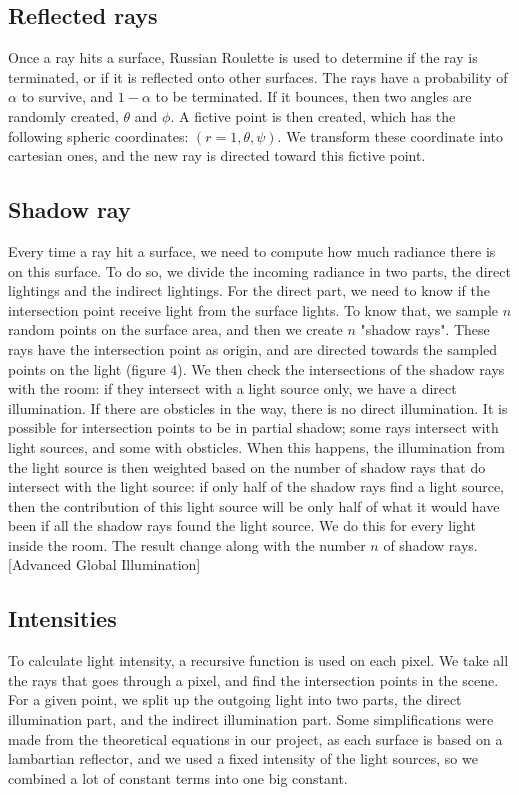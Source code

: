\documentclass[12pt]{article}
\numberwithin{equation}{section}
\begin{document}
\subsection{Reflected rays}
Once a ray hits a surface, Russian Roulette is used to determine if the ray is terminated, or if it is reflected onto other surfaces. The rays have a probability of $\alpha$ to survive, and $1-\alpha$ to be terminated. If it bounces, then two angles are randomly created, $\theta$ and $\phi$. A fictive point is then created, which has the following spheric coordinates: $(r=1, \theta, \psi)$. We transform these coordinate into cartesian ones, and the new ray is directed toward this fictive point.

\subsection{Shadow ray}

Every time a ray hit a surface, we need to compute how much radiance there is on this surface. To do so, we divide the incoming radiance in two parts, the direct lightings and the indirect lightings. For the direct part, we need to know if the intersection point receive light from the surface lights. To know that, we sample $n$ random points on the surface area, and then we create $n$ "shadow rays". These rays have the intersection point as origin, and are directed towards the sampled points on the light (figure $4$). We then check the intersections of the shadow rays with the room: if they intersect with a light source only, we have a direct illumination. If there are obsticles in the way, there is no direct illumination. It is possible for intersection points to be in partial shadow; some rays intersect with light sources, and some with obsticles. When this happens, the illumination from the light source is then weighted based on the number of shadow rays that do intersect with the light source: if only half of the shadow rays find a light source, then the contribution of this light source will be only half of what it would have been if all the shadow rays found the light source. We do this for every light inside the room. The result change along with the number $n$ of shadow rays. [Advanced Global Illumination]

\subsection{Intensities}
To calculate light intensity, a recursive function is used on each pixel. We take all the rays that goes through a pixel, and find the intersection points in the scene. For a given point, we split up the outgoing light into two parts, the direct illumination part, and the indirect illumination part. Some simplifications were made from the theoretical equations in our project, as each surface is based on a lambartian reflector, and we used a fixed intensity of the light sources, so we combined a lot of constant terms into one big constant.\\
\end{document}
